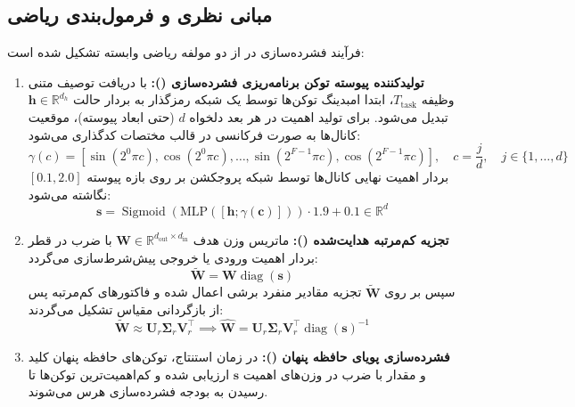 \subsection{مبانی نظری و فرمول‌بندی ریاضی}
فرآیند فشرده‌سازی در  از دو مولفه ریاضی وابسته تشکیل شده است:
\begin{enumerate}
    \item \textbf{تولیدکننده پیوسته توکن برنامه‌ریزی فشرده‌سازی ():} با دریافت توصیف متنی وظیفه $T_{\text{task}}$، ابتدا امبدینگ توکن‌ها توسط یک شبکه رمزگذار به بردار حالت $\mathbf{h} \in \mathbb{R}^{d_h}$ تبدیل می‌شود. برای تولید اهمیت در هر بعد دلخواه $d$ (حتی ابعاد پیوسته)، موقعیت کانال‌ها به صورت فرکانسی در قالب مختصات  کدگذاری می‌شود:
    \begin{equation}
    \gamma(c) = \left[ \sin(2^0 \pi c), \cos(2^0 \pi c), \dots, \sin(2^{F-1} \pi c), \cos(2^{F-1} \pi c) \right], \quad c = \frac{j}{d}, \quad j \in \{1, \dots, d\}
    \end{equation}
    بردار اهمیت نهایی کانال‌ها توسط شبکه پروجکشن بر روی بازه پیوسته $[0.1, 2.0]$ نگاشته می‌شود:
    \begin{equation}
    \mathbf{s} = \operatorname{Sigmoid}(\text{MLP}([\mathbf{h}; \gamma(\mathbf{c})])) \cdot 1.9 + 0.1 \in \mathbb{R}^d
    \end{equation}
    \item \textbf{تجزیه کم‌مرتبه هدایت‌شده ():} ماتریس وزن هدف $\mathbf{W} \in \mathbb{R}^{d_{\text{out}} \times d_{\text{in}}}$ با ضرب در قطر بردار اهمیت ورودی یا خروجی پیش‌شرط‌سازی می‌گردد:
    \begin{equation}
    \tilde{\mathbf{W}} = \mathbf{W} \operatorname{diag}(\mathbf{s})
    \end{equation}
    سپس بر روی $\tilde{\mathbf{W}}$ تجزیه مقادیر منفرد برشی اعمال شده و فاکتورهای کم‌مرتبه پس از بازگردانی مقیاس تشکیل می‌گردند:
    \begin{equation}
    \tilde{\mathbf{W}} \approx \mathbf{U}_r \mathbf{\Sigma}_r \mathbf{V}_r^\top \implies \hat{\mathbf{W}} = \mathbf{U}_r \mathbf{\Sigma}_r \mathbf{V}_r^\top \operatorname{diag}(\mathbf{s})^{-1}
    \end{equation}
    \item \textbf{فشرده‌سازی پویای حافظه پنهان ():} در زمان استنتاج، توکن‌های حافظه پنهان کلید و مقدار با ضرب در وزن‌های اهمیت $\mathbf{s}$ ارزیابی شده و کم‌اهمیت‌ترین توکن‌ها تا رسیدن به بودجه فشرده‌سازی هرس می‌شوند.
\end{enumerate}

